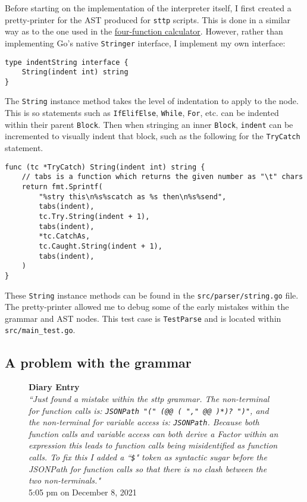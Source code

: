 Before starting on the implementation of the interpreter itself, I first created a pretty-printer for the AST produced for \verb|sttp| scripts. This is done in a similar way as to the one used in the \hyperref[sec:four-function-calc]{four-function calculator}. However, rather than implementing Go's native \verb|Stringer| interface, I implement my own interface:

\begin{verbatim}
type indentString interface {
    String(indent int) string
}
\end{verbatim}

The \verb|String| instance method takes the level of indentation to apply to the node. This is so statements such as \verb|IfElifElse|, \verb|While|, \verb|For|, etc. can be indented within their parent \verb|Block|. Then when stringing an inner \verb|Block|, \verb|indent| can be incremented to visually indent that block, such as the following for the \verb|TryCatch| statement.

\begin{verbatim}
func (tc *TryCatch) String(indent int) string {
    // tabs is a function which returns the given number as "\t" chars
    return fmt.Sprintf(
        "%stry this\n%s%scatch as %s then\n%s%send",
        tabs(indent),
        tc.Try.String(indent + 1),
        tabs(indent),
        *tc.CatchAs,
        tc.Caught.String(indent + 1),
        tabs(indent),
    )
}
\end{verbatim}

These \verb|String| instance methods can be found in the \verb|src/parser/string.go| file. The pretty-printer allowed me to debug some of the early mistakes within the grammar and AST nodes. This test case is \verb|TestParse| and is located within \verb|src/main_test.go|.

\subsection{A problem with the grammar}

\begin{figure}[H]
    \begin{center}
        \textbf{Diary Entry}\\[0.5em]
        \cprotect\textit{``Just found a mistake within the sttp grammar. The non-terminal for function calls is: \verb|JSONPath "(" (@@ ( "," @@ )*)? ")"|, and the non-terminal for variable access is: \verb|JSONPath|. Because both function calls and variable access can both derive a Factor within an expression this leads to function calls being misidentified as function calls. To fix this I added a ``\verb|$|" token as syntactic sugar before the JSONPath for function calls so that there is no clash between the two non-terminals."}\\[0.5em]
        \tiny{5:05 pm on December 8, 2021}
    \end{center}
\end{figure}

